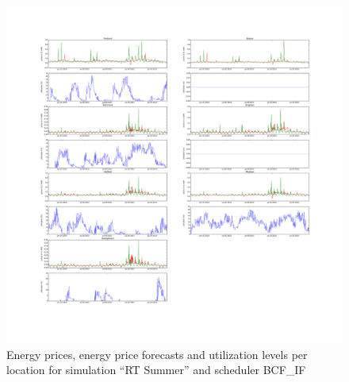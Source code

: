 \begin{figure}[htbp]
	\centering
	\vspace*{-0.6in}
	\hspace*{-1.9in}
		\includegraphics[width=1.60\textwidth]{figures/appendix_simulation_results/RT_Summer_scenario_4.pdf}
	\vspace*{-1.0in}
	\caption{Energy prices, energy price forecasts and utilization levels per location for simulation ``RT Summer'' and scheduler BCF\_IF}
	\label{fig:app_RT_Summer_scenario_4}
\end{figure}

